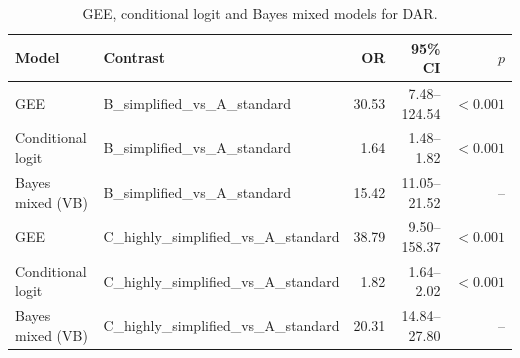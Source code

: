 \begin{table}[H]
\caption{GEE, conditional logit and Bayes mixed models for DAR.}
\label{tab:da:regression}
\centering
\begin{tabular}{llrrr}
\toprule
Model & Contrast & OR & 95\% CI & $p$ \\
\midrule
GEE & B_simplified_vs_A_standard & 30.53 & 7.48--124.54 & $<0.001$ \\
Conditional logit & B_simplified_vs_A_standard & 1.64 & 1.48--1.82 & $<0.001$ \\
Bayes mixed (VB) & B_simplified_vs_A_standard & 15.42 & 11.05--21.52 & -- \\
GEE & C_highly_simplified_vs_A_standard & 38.79 & 9.50--158.37 & $<0.001$ \\
Conditional logit & C_highly_simplified_vs_A_standard & 1.82 & 1.64--2.02 & $<0.001$ \\
Bayes mixed (VB) & C_highly_simplified_vs_A_standard & 20.31 & 14.84--27.80 & -- \\
\bottomrule
\end{tabular}
\end{table}
